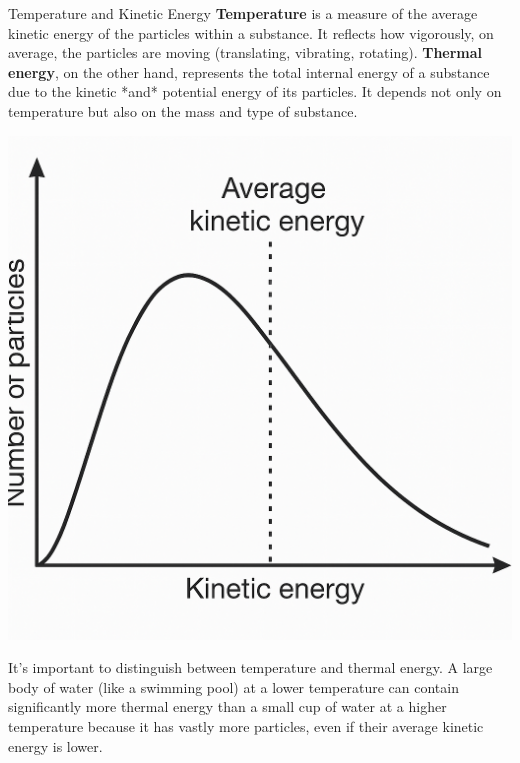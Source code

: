 \begin{keyconcept}{Temperature and Kinetic Energy}
\textbf{Temperature} is a measure of the average kinetic energy of the particles within a substance. It reflects how vigorously, on average, the particles are moving (translating, vibrating, rotating). \textbf{Thermal energy}, on the other hand, represents the total internal energy of a substance due to the kinetic *and* potential energy of its particles. It depends not only on temperature but also on the mass and type of substance.
\end{keyconcept}

\begin{marginfigure}[-30pt] %
\includegraphics[width=\linewidth]{kinetic_energy.png} %
\caption{A typical distribution of kinetic energies among particles in a substance at a given temperature. Higher temperatures shift the average energy to the right and broaden the distribution.}
\label{fig:particle_distribution}
\end{marginfigure}

It's important to distinguish between temperature and thermal energy. A large body of water (like a swimming pool) at a lower temperature can contain significantly more thermal energy than a small cup of water at a higher temperature because it has vastly more particles, even if their average kinetic energy is lower.

